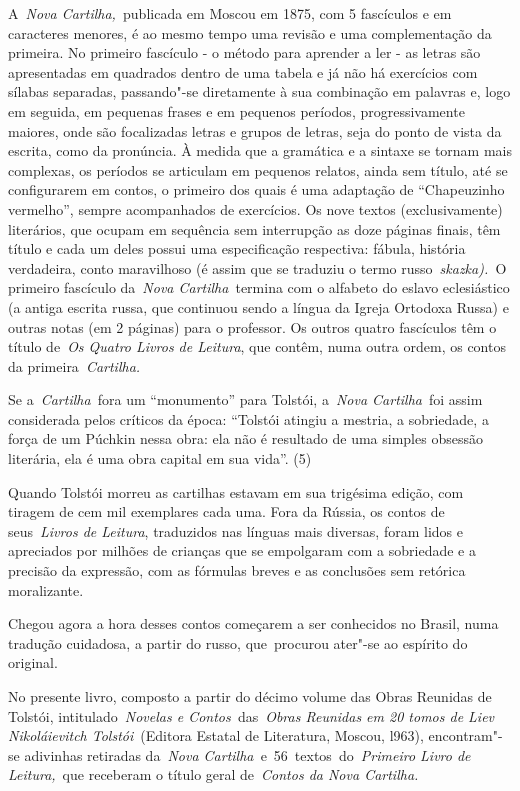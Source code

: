 A~\emph{Nova Cartilha,~}publicada em Moscou em 1875, com 5 fascículos e
em caracteres menores, é ao mesmo tempo uma revisão e uma complementação
da primeira. No primeiro fascículo - o método para aprender a ler - as
letras são apresentadas em quadrados dentro de uma tabela e já não há
exercícios com sílabas separadas, passando"-se diretamente à sua
combinação em palavras e, logo em seguida, em pequenas frases e em
pequenos períodos, progressivamente maiores, onde são focalizadas letras
e grupos de letras, seja do ponto de vista da escrita, como da
pronúncia. À medida que a gramática e a sintaxe se tornam mais
complexas, os períodos se articulam em pequenos relatos, ainda sem
título, até se configurarem em contos, o primeiro dos quais é uma
adaptação de ``Chapeuzinho vermelho'', sempre acompanhados de
exercícios. Os nove textos (exclusivamente) literários, que ocupam em
sequência sem interrupção as doze páginas finais, têm título e cada um
deles possui uma especificação respectiva: fábula, história verdadeira,
conto maravilhoso (é assim que se traduziu o termo
russo~\emph{skazka).~}O primeiro fascículo da~\emph{Nova
Cartilha}~termina com o alfabeto do eslavo eclesiástico (a antiga
escrita russa, que continuou sendo a língua da Igreja Ortodoxa Russa) e
outras notas (em 2 páginas) para o professor. Os outros quatro
fascículos têm o título de~\emph{Os Quatro Livros de Leitura}, que
contêm, numa outra ordem, os contos da primeira~\emph{Cartilha.}

Se a~\emph{Cartilha~}fora um ``monumento'' para Tolstói, a~\emph{Nova
Cartilha}~foi assim considerada pelos críticos da época: ``Tolstói
atingiu a mestria, a sobriedade, a força de um Púchkin nessa obra: ela
não é resultado de uma simples obsessão literária, ela é uma obra
capital em sua vida''. (5)

Quando Tolstói morreu as cartilhas estavam em sua trigésima edição, com
tiragem de cem mil exemplares cada uma. Fora da Rússia, os contos de
seus~\emph{Livros de Leitura}, traduzidos nas línguas mais diversas,
foram lidos e apreciados por milhões de crianças que se empolgaram com a
sobriedade e a precisão da expressão, com as fórmulas breves e as
conclusões sem retórica moralizante.

Chegou agora a hora desses contos começarem a ser conhecidos no Brasil,
numa tradução cuidadosa, a partir do russo, que~procurou ater"-se ao
espírito do original.

No presente livro, composto a partir do décimo volume das Obras Reunidas
de Tolstói, intitulado~\emph{Novelas e Contos~}das~\emph{Obras Reunidas
em 20 tomos de Liev Nikoláievitch Tolstói}~(Editora Estatal de
Literatura, Moscou, l963), encontram"-se adivinhas retiradas
da~\emph{Nova Cartilha~}e~56~textos\emph{~}do~\emph{Primeiro Livro de
Leitura,}~que receberam o título geral de~\emph{Contos da Nova
Cartilha.}

